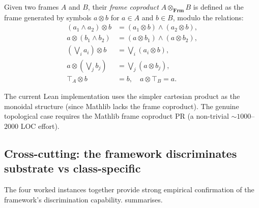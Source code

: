 \documentclass[11pt,a4paper]{article}
\theoremstyle{plain}
\theoremstyle{definition}
\theoremstyle{remark}
\newcommand{\cat}[1]{\mathbf{#1}}
\newcommand{\Frm}{\cat{Frm}}
\begin{document}
Given two frames $A$ and $B$, their \emph{frame coproduct} $A \otimes_{\Frm} B$ is defined as the frame generated by symbols $a \otimes b$ for $a \in A$ and $b \in B$, modulo the relations:
\begin{align*}
(a_1 \wedge a_2) \otimes b &= (a_1 \otimes b) \wedge (a_2 \otimes b), \\
a \otimes (b_1 \wedge b_2) &= (a \otimes b_1) \wedge (a \otimes b_2), \\
(\textstyle\bigvee_i a_i) \otimes b &= \textstyle\bigvee_i (a_i \otimes b), \\
a \otimes (\textstyle\bigvee_j b_j) &= \textstyle\bigvee_j (a \otimes b_j), \\
\top_A \otimes b &= b, \quad a \otimes \top_B = a.
\end{align*}

The current Lean implementation uses the simpler cartesian product as the monoidal structure (since Mathlib lacks the frame coproduct). The genuine topological case requires the Mathlib frame coproduct PR (a non-trivial ${\sim}1000$--$2000$ LOC effort).

\subsection{Cross-cutting: the framework discriminates substrate vs class-specific}\label{sec:inst:cross}

The four worked instances together provide strong empirical confirmation of the framework's discrimination capability.  summarises.
\end{document}
